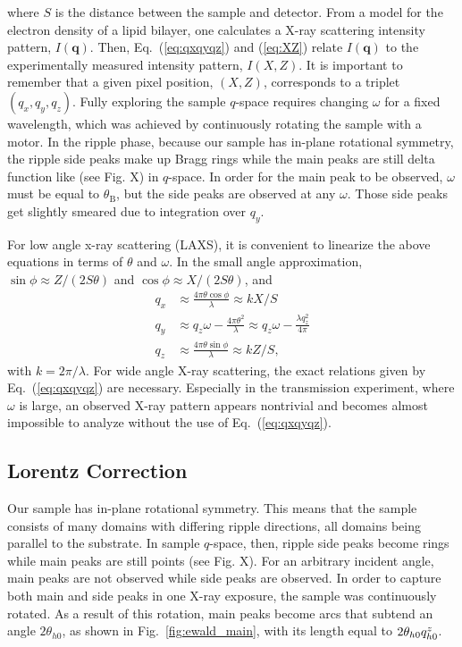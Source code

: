 where $S$ is the distance between the sample and detector.
From a model for the electron density of a lipid bilayer, one calculates
a X-ray scattering intensity pattern, $I(\mathbf{q})$. Then, Eq.~(\ref{eq:qxqyqz})
and (\ref{eq:XZ}) relate $I(\mathbf{q})$ to the experimentally measured
intensity pattern, $I(X,Z)$. It is important to remember that a given pixel
position, $(X,Z)$, corresponds to a triplet $(q_x, q_y, q_z)$. Fully exploring 
the sample $q$-space requires changing $\omega$ for a fixed wavelength, which was
achieved by continuously rotating the sample with a motor. In the ripple phase, 
because our sample has in-plane rotational symmetry,
the ripple side peaks make up Bragg rings while the main peaks are still 
delta function like (see Fig. X) in $q$-space. In order for the main peak to be
observed, $\omega$ must be equal to $\theta_\mathrm{B}$, but the side peaks
are observed at any $\omega$. Those side peaks get slightly smeared due to 
integration over $q_y$.

For low angle x-ray scattering (LAXS), it is convenient to linearize the above
equations in terms of $\theta$ and $\omega$. In the small angle approximation, 
$\sin\phi \approx Z/(2S\theta)$ and $\cos\phi \approx X/(2S\theta)$, and
\begin{align}
  q_x &\approx \frac{4\pi\theta\cos\phi}{\lambda} \approx kX/S \nonumber\\
  q_y &\approx q_z\omega -\frac{4\pi\theta^2}{\lambda} \approx q_z\omega - \frac{\lambda q_z^2}{4\pi}\nonumber\\
  q_z &\approx \frac{4\pi\theta\sin\phi}{\lambda} \approx kZ/S,
  \label{eq:qxqyqz_small}
\end{align}
with $k=2\pi/\lambda$. For wide angle X-ray scattering, the exact relations given
by Eq.~(\ref{eq:qxqyqz}) are necessary. Especially in the transmission experiment,
where $\omega$ is large, an observed X-ray pattern appears nontrivial and becomes
almost impossible to analyze without the use of Eq.~(\ref{eq:qxqyqz}).


\subsection{Lorentz Correction}\label{sec:Lorentz_correction}
Our sample has in-plane rotational symmetry. This means that the sample 
consists of many domains with differing ripple directions, all domains
being parallel to the substrate.  
In sample $q$-space, then, ripple side peaks become rings while main peaks are
still points (see Fig. X). For an arbitrary incident angle, main peaks are not observed
while side peaks are observed. 
In order to capture both main and side peaks in one X-ray exposure, 
the sample was continuously rotated. As a result of this rotation, 
main peaks become arcs that subtend an angle $2\theta_{h0}$,
as shown in Fig.~\ref{fig:ewald_main}, with its length
equal to $2\theta_{h0}q_{h0}^z$.  

